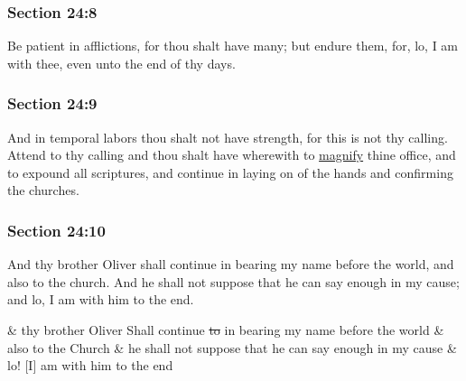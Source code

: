 	\subsubsection{Section 24:8} %
		\label{DC24-8}

		Be patient in afflictions, for thou shalt have many; but endure them, for, lo, I am with thee, even unto the end of thy days.


	\subsubsection{Section 24:9} %
		\label{DC24-9}

		And in temporal labors thou shalt not have strength, for this is not thy calling. Attend to thy calling and thou shalt have wherewith to \hyperref[MAGNIFY]{magnify} thine office, and to expound all scriptures, and continue in laying on of the hands and confirming the churches.


	\subsubsection{Section 24:10} %
		\label{DC24-10}

		And thy brother Oliver shall continue in bearing my name before the world, and also to the church. And he shall not suppose that he can say enough in my cause; and lo, I am with him to the end.

		\begin{framed}
		\scriptsize
			\begin{compactdesc}
				\item[JSP] \& thy brother Oliver Shall continue \sout{to} in bearing my name before the world \& also to the Church \& he shall not suppose that he can say enough in my cause \& lo! [I] am with him to the end
			\end{compactdesc}
		\end{framed}

